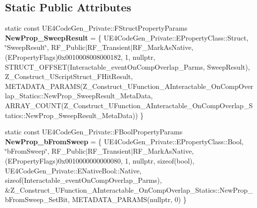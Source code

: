 \subsection*{Static Public Attributes}
\begin{DoxyCompactItemize}
\item 
\mbox{\label{struct_z___construct___u_function___a_interactable___on_comp_overlap___statics_ae8f103e9a3461f15a6bc6461d99272a2}} 
static const U\+E4\+Code\+Gen\+\_\+\+Private\+::\+F\+Struct\+Property\+Params {\bfseries New\+Prop\+\_\+\+Sweep\+Result} = \{ U\+E4\+Code\+Gen\+\_\+\+Private\+::\+E\+Property\+Class\+::\+Struct, \char`\"{}Sweep\+Result\char`\"{}, R\+F\+\_\+\+Public$\vert$R\+F\+\_\+\+Transient$\vert$R\+F\+\_\+\+Mark\+As\+Native, (E\+Property\+Flags)0x0010008008000182, 1, nullptr, S\+T\+R\+U\+C\+T\+\_\+\+O\+F\+F\+S\+E\+T(\+Interactable\+\_\+event\+On\+Comp\+Overlap\+\_\+\+Parms, Sweep\+Result), Z\+\_\+\+Construct\+\_\+\+U\+Script\+Struct\+\_\+\+F\+Hit\+Result, M\+E\+T\+A\+D\+A\+T\+A\+\_\+\+P\+A\+R\+A\+M\+S(\+Z\+\_\+\+Construct\+\_\+\+U\+Function\+\_\+\+A\+Interactable\+\_\+\+On\+Comp\+Overlap\+\_\+\+Statics\+::\+New\+Prop\+\_\+\+Sweep\+Result\+\_\+\+Meta\+Data, A\+R\+R\+A\+Y\+\_\+\+C\+O\+U\+N\+T(\+Z\+\_\+\+Construct\+\_\+\+U\+Function\+\_\+\+A\+Interactable\+\_\+\+On\+Comp\+Overlap\+\_\+\+Statics\+::\+New\+Prop\+\_\+\+Sweep\+Result\+\_\+\+Meta\+Data)) \}
\item 
\mbox{\label{struct_z___construct___u_function___a_interactable___on_comp_overlap___statics_a3fdb34f6a5d5d15f0e09a0d545595ec9}} 
static const U\+E4\+Code\+Gen\+\_\+\+Private\+::\+F\+Bool\+Property\+Params {\bfseries New\+Prop\+\_\+b\+From\+Sweep} = \{ U\+E4\+Code\+Gen\+\_\+\+Private\+::\+E\+Property\+Class\+::\+Bool, \char`\"{}b\+From\+Sweep\char`\"{}, R\+F\+\_\+\+Public$\vert$R\+F\+\_\+\+Transient$\vert$R\+F\+\_\+\+Mark\+As\+Native, (E\+Property\+Flags)0x0010000000000080, 1, nullptr, sizeof(bool), U\+E4\+Code\+Gen\+\_\+\+Private\+::\+E\+Native\+Bool\+::\+Native, sizeof(\+Interactable\+\_\+event\+On\+Comp\+Overlap\+\_\+\+Parms), \&\+Z\+\_\+\+Construct\+\_\+\+U\+Function\+\_\+\+A\+Interactable\+\_\+\+On\+Comp\+Overlap\+\_\+\+Statics\+::\+New\+Prop\+\_\+b\+From\+Sweep\+\_\+\+Set\+Bit, M\+E\+T\+A\+D\+A\+T\+A\+\_\+\+P\+A\+R\+A\+M\+S(nullptr, 0) \}
\item 
\mbox{\label{struct_z___construct___u_function___a_interactable___on_comp_overlap___statics_a0e84bf202f03275267b19a4e14c15bbf}} 

\end{DoxyCompactItemize}
